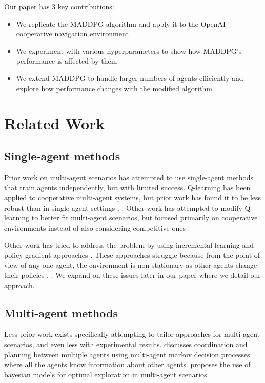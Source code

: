 \documentclass{article}
\begin{document}
Our paper has 3 key contributions:
\begin{itemize}[nosep]
\item We replicate the MADDPG algorithm and apply it to the OpenAI cooperative navigation environment
\item We experiment with various hyperparameters to show how MADDPG's performance is affected by them
\item We extend MADDPG to handle larger numbers of agents efficiently and explore how performance changes with the modified algorithm
\end{itemize}

\section{Related Work}
\subsection{Single-agent methods}
Prior work on multi-agent scenarios has attempted to use single-agent methods that train agents independently, but with limited success. Q-learning has been applied to cooperative multi-agent systems, but prior work has found it to be less robust than in single-agent settings \cite{sandholm1996}, \cite{claus1998dynamics}. Other work has attempted to modify Q-learning to better fit multi-agent scenarios, but focused primarily on cooperative environments instead of also considering competitive ones \cite{cooperativeQ}.

Other work has tried to address the problem by using incremental learning and policy gradient approaches \cite{buffet2007}. These approaches struggle because from the point of view of any one agent, the environment is non-stationary as other agents change their policies \cite{busoniu2008comprehensive}, \cite{bucsoniu2010multi}. We expand on these issues later in our paper where we detail our approach.

\subsection{Multi-agent methods}

Less prior work exists specifically attempting to tailor approaches for multi-agent scenarios, and even less with experimental results. \cite{boutilier1996planning} discusses coordination and planning between multiple agents using multi-agent markov decision processes where all the agents know information about other agents. \cite{chalkiadakis2003coordination} proposes the use of bayesian models for optimal exploration in multi-agent scenarios.
\end{document}
